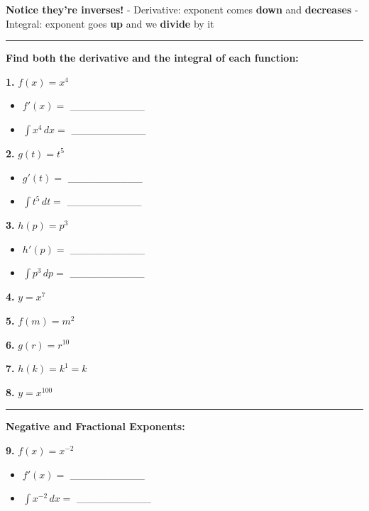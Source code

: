 \documentclass[
  11pt,
]{article}
\providecommand{\tightlist}{%
  \setlength{\itemsep}{0pt}\setlength{\parskip}{0pt}}
\begin{document}
\textbf{Notice they're inverses!} - Derivative: exponent comes
\textbf{down} and \textbf{decreases} - Integral: exponent goes
\textbf{up} and we \textbf{divide} by it

\begin{center}\rule{0.5\linewidth}{0.5pt}\end{center}

\textbf{Find both the derivative and the integral of each function:}

\textbf{1.} \(f(x) = x^4\)

\begin{itemize}
\tightlist
\item
  \(f'(x) ={}\) \_\_\_\_\_\_\_\_\_\_
\item
  \(\int x^4 \, dx ={}\) \_\_\_\_\_\_\_\_\_\_
\end{itemize}

\textbf{2.} \(g(t) = t^5\)

\begin{itemize}
\tightlist
\item
  \(g'(t) ={}\) \_\_\_\_\_\_\_\_\_\_
\item
  \(\int t^5 \, dt ={}\) \_\_\_\_\_\_\_\_\_\_
\end{itemize}

\textbf{3.} \(h(p) = p^3\)

\begin{itemize}
\tightlist
\item
  \(h'(p) ={}\) \_\_\_\_\_\_\_\_\_\_
\item
  \(\int p^3 \, dp ={}\) \_\_\_\_\_\_\_\_\_\_
\end{itemize}

\textbf{4.} \(y = x^7\)

\textbf{5.} \(f(m) = m^2\)

\textbf{6.} \(g(r) = r^{10}\)

\textbf{7.} \(h(k) = k^1 = k\)

\textbf{8.} \(y = x^{100}\)

\begin{center}\rule{0.5\linewidth}{0.5pt}\end{center}

\textbf{Negative and Fractional Exponents:}

\textbf{9.} \(f(x) = x^{-2}\)

\begin{itemize}
\tightlist
\item
  \(f'(x) ={}\) \_\_\_\_\_\_\_\_\_\_
\item
  \(\int x^{-2} \, dx ={}\) \_\_\_\_\_\_\_\_\_\_
\end{itemize}
\end{document}
